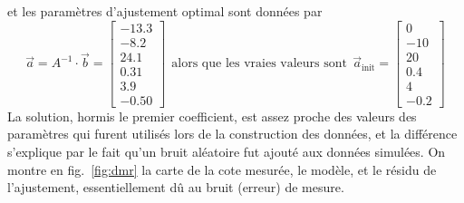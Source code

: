 \documentclass[main.tex]{subfiles}
\begin{document}
et les paramètres d'ajustement optimal sont données par
\begin{equation}
    \vec{a}=A^{-1}\cdot\vec{b}=
    \begin{bmatrix}
        -13.3 \\
        -8.2  \\
        24.1  \\
        0.31  \\
        3.9   \\
        -0.50
    \end{bmatrix}
    \ \ \text{alors que les vraies valeurs sont}\ \ \vec{a}_{\text{init}}=
    \begin{bmatrix}
        0   \\
        -10 \\
        20  \\
        0.4 \\
        4   \\
        -0.2
    \end{bmatrix}
\end{equation}
La solution, hormis le premier coefficient, est assez proche des valeurs des paramètres qui furent utilisés lors de la construction des données, et la différence s'explique par le fait qu'un bruit aléatoire fut ajouté aux données simulées. On montre en fig.~\ref{fig:dmr} la carte de la cote mesurée, le modèle, et le résidu de l'ajustement, essentiellement dû au bruit (erreur) de mesure.
\end{document}

